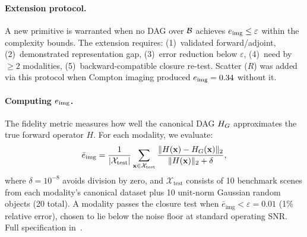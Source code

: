 \medskip

\noindent{}

\paragraph{Extension protocol.}
A new primitive is warranted when no DAG over $\mathcal{B}$ achieves $e_{\mathrm{img}} \leq \varepsilon$ within the complexity bounds. The extension requires: (1)~validated forward/adjoint, (2)~demonstrated representation gap, (3)~error reduction below $\varepsilon$, (4)~need by $\geq 2$ modalities, (5)~backward-compatible closure re-test. Scatter ($R$) was added via this protocol when Compton imaging produced $e_{\mathrm{img}} = 0.34$ without it.

\paragraph{Computing $e_{\mathrm{img}}$.}
The fidelity metric measures how well the canonical DAG $H_{G}$ approximates the true forward operator $H$. For each modality, we evaluate:
\begin{equation}
  \bar{e}_{\mathrm{img}} = \frac{1}{|\mathcal{X}_{\mathrm{test}}|}
  \sum_{\mathbf{x} \in \mathcal{X}_{\mathrm{test}}}
  \frac{\|H(\mathbf{x}) - H_{G}(\mathbf{x})\|_2}{\|H(\mathbf{x})\|_2 + \delta},
  \label{eq:etier_mean}
\end{equation}
where $\delta = 10^{-8}$ avoids division by zero, and $\mathcal{X}_{\mathrm{test}}$ consists of 10 benchmark scenes from each modality's canonical dataset plus 10 unit-norm Gaussian random objects (20 total). A modality passes the closure test when $\bar{e}_{\mathrm{img}} < \varepsilon = 0.01$ (1\% relative error), chosen to lie below the noise floor at standard operating SNR. Full specification in~\cite{yang2026fpt}.

